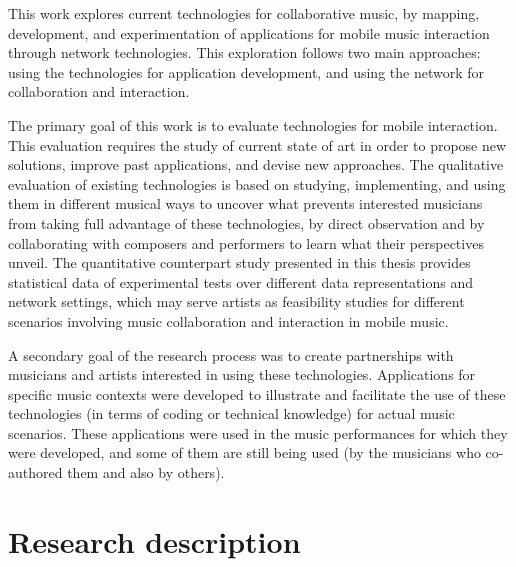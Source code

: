 This work explores current technologies for collaborative music, by mapping, development, and experimentation of applications for mobile music interaction through network technologies.
This exploration follows two main approaches: using the technologies for application development, and using the network for collaboration and interaction.

The primary goal of this work is to evaluate technologies for mobile interaction.
This evaluation requires the study of current state of art in order to propose new solutions, improve past applications, and devise new approaches.
The qualitative evaluation of existing technologies is based on studying, implementing, and using them in different musical ways to uncover what prevents interested musicians from taking full advantage of these technologies, by direct observation and by collaborating with composers and performers to learn what their perspectives unveil.
The quantitative counterpart study presented in this thesis provides statistical data of experimental tests over different data representations and network settings, which may serve artists as feasibility studies for different scenarios involving music collaboration and interaction in mobile music.

A secondary goal of the research process was to create partnerships with musicians and artists interested in using these technologies.
Applications for specific music contexts were developed to illustrate and facilitate the use of these technologies (in terms of coding or technical knowledge) for actual music scenarios.
These applications were used in the music performances for which they were developed, and some of them are still being used (by the musicians who co-authored them and also by others).

\section{Research description}

